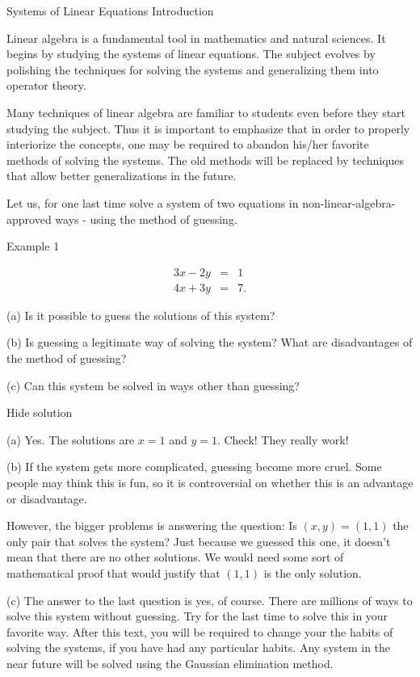 

Systems of Linear Equations
Introduction

Linear algebra is a fundamental tool in mathematics and natural sciences. It begins by studying the systems of linear equations. The subject evolves by polishing the techniques for solving the systems and generalizing them into operator theory.

Many techniques of linear algebra are familiar to students even before they start studying the subject. Thus it is important to emphasize that in order to properly interiorize the concepts, one may be required to abandon his/her favorite methods of solving the systems. The old methods will be replaced by techniques that allow better generalizations in the future.

Let us, for one last time solve a system of two equations in non-linear-algebra-approved ways - using the method of guessing.

Example 1

\begin{eqnarray*} 3x-2y&=&1\\ 4x+3y&=&7. \end{eqnarray*}

    (a) Is it possible to guess the solutions of this system?

    (b) Is guessing a legitimate way of solving the system? What are disadvantages of the method of guessing?

    (c) Can this system be solved in ways other than guessing?

Hide solution

    (a) Yes. The solutions are \( x=1 \) and \( y=1 \). Check! They really work!

    (b) If the system gets more complicated, guessing become more cruel. Some people may think this is fun, so it is controversial on whether this is an advantage or disadvantage.

    However, the bigger problems is answering the question: Is \( (x,y)=(1,1) \) the only pair that solves the system? Just because we guessed this one, it doesn’t mean that there are no other solutions. We would need some sort of mathematical proof that would justify that \( (1,1) \) is the only solution.

    (c) The answer to the last question is yes, of course. There are millions of ways to solve this system without guessing. Try for the last time to solve this in your favorite way. After this text, you will be required to change your the habits of solving the systems, if you have had any particular habits. Any system in the near future will be solved using the Gaussian elimination method.

